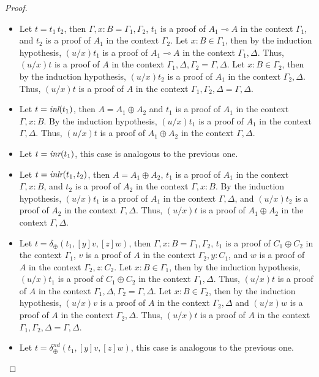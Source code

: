 \documentclass[screen, sigconf,authorversion,nonacm]{acmart}
\theoremstyle{acmdefinition}
\numberwithin{equation}{section}
\newcommand\abstr[1]{[#1]}
\newcommand\inl{\mbox{\it inl}}
\newcommand\inr{\mbox{\it inr}}
\newcommand\inlr{\mbox{\it inlr}}
\newcommand\elimplus{\delta_{\oplus}}
\begin{document}
\begin{proof}
\begin{itemize}
     \item Let $t=t_1\,t_2$, then $\Gamma,x:B = \Gamma_1,\Gamma_2$, $t_1$ is a proof of $A_1\multimap A$ in the context $\Gamma_1$, and $t_2$ is a proof of $A_1$ in the context $\Gamma_2$. Let $x:B\in\Gamma_1$, then by the induction hypothesis, $(u/x)t_1$ is a proof of $A_1\multimap A$ in the context $\Gamma_1,\Delta$. Thus, $(u/x)t$ is a proof of $A$ in the context $\Gamma_1,\Delta,\Gamma_2=\Gamma,\Delta$.
     Let $x:B\in\Gamma_2$, then by the induction hypothesis, $(u/x)t_2$ is a proof of $A_1$ in the context $\Gamma_2,\Delta$. Thus, $(u/x)t$ is a proof of $A$ in the context $\Gamma_1,\Gamma_2,\Delta=\Gamma,\Delta$.

     \item Let $t=\inl(t_1)$, then $A=A_1\oplus A_2$ and $t_1$ is a proof of $A_1$ in the context $\Gamma,x:B$. By the induction hypothesis, $(u/x)t_1$ is a proof of $A_1$ in the context $\Gamma,\Delta$. Thus, $(u/x)t$ is a proof of $A_1\oplus A_2$ in the context $\Gamma,\Delta$.
     
     \item Let $t=\inr(t_1)$, this case is analogous to the previous one.
     
     \item Let $t=\inlr(t_1,t_2)$, then $A=A_1\oplus A_2$, $t_1$ is a proof of $A_1$ in the context $\Gamma,x:B$, and $t_2$ is a proof of $A_2$ in the context $\Gamma,x:B$. By the induction hypothesis, $(u/x)t_1$ is a proof of $A_1$ in the context $\Gamma,\Delta$, and $(u/x)t_2$ is a proof of $A_2$ in the context $\Gamma,\Delta$. Thus, $(u/x)t$ is a proof of $A_1\oplus A_2$ in the context $\Gamma,\Delta$.

     \item Let $t=\elimplus(t_1,\abstr{y}v,\abstr{z}w)$, then $\Gamma,x:B=\Gamma_1,\Gamma_2$, $t_1$ is a proof of $C_1\oplus C_2$ in the context $\Gamma_1$, $v$ is a proof of $A$ in the context $\Gamma_2,y:C_1$, and $w$ is a proof of $A$ in the context $\Gamma_2,z:C_2$. Let $x:B\in\Gamma_1$, then by the induction hypothesis, $(u/x)t_1$ is a proof of $C_1\oplus C_2$ in the context $\Gamma_1,\Delta$. Thus, $(u/x)t$ is a proof of $A$ in the context $\Gamma_1,\Delta,\Gamma_2=\Gamma,\Delta$.
     Let $x:B\in\Gamma_2$, then by the induction hypothesis, $(u/x)v$ is a proof of $A$ in the context $\Gamma_2,\Delta$ and $(u/x)w$ is a proof of $A$ in the context $\Gamma_2,\Delta$. Thus, $(u/x)t$ is a proof of $A$ in the context $\Gamma_1,\Gamma_2,\Delta=\Gamma,\Delta$.

     \item Let $t=\elimplus^{nd}(t_1,\abstr{y}v,\abstr{z}w)$, this case is analogous to the previous one.
     \qedhere
  \end{itemize}
\end{proof}
\end{document}
